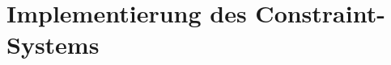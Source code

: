 \section{Implementierung des Constraint-Systems}\label{section:Implementierung des Constraint-Systems}